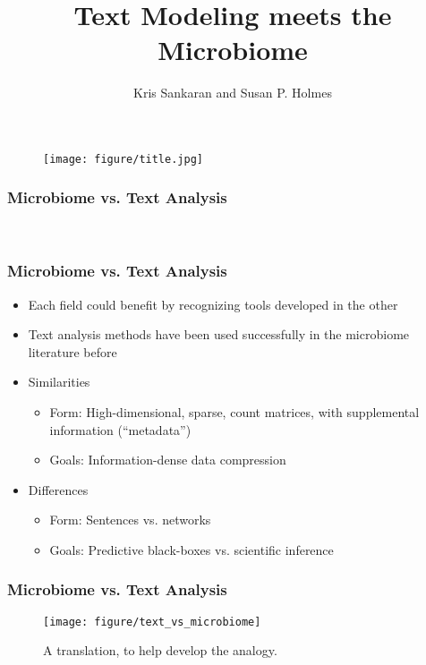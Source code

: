 \documentclass{beamer}
\title{Text Modeling meets the Microbiome}
\author{Kris Sankaran and Susan P. Holmes}
\institute{Department of Statistics, Stanford University}
\date{}
\begin{document}
\begin{frame}
  \maketitle
\begin{figure}
  \centering
  \texttt{[image: figure/title.jpg]}
\end{figure}

\end{frame}

\begin{frame}
  \frametitle{Microbiome vs. Text Analysis}
  \begingroup
  \fontsize{10pt}{10pt}\selectfont
  {\ttfamily
  \def\arraystretch{1.2}
  \setlength{\tabcolsep}{0.2em} %
  \begin{table}
     
    \\[12pt]
     
  \end{table}
  }
  \endgroup
\end{frame}

\begin{frame}
  \frametitle{Microbiome vs. Text Analysis}
 \begin{itemize}
 \item Each field could benefit by recognizing tools developed in the other
 \item Text analysis methods have been used successfully in the microbiome
   literature before \citep{cai2017learning, shafiei2015biomico,
     chen2012estimating, yan2017metatopics}
 \item Similarities
   \begin{itemize}
   \item Form: High-dimensional, sparse, count matrices, with supplemental
     information (``metadata'')
   \item Goals: Information-dense data compression
   \end{itemize}
 \item Differences
   \begin{itemize}
   \item Form: Sentences vs. networks
   \item Goals: Predictive black-boxes vs. scientific inference
   \end{itemize}
 \end{itemize} 
\end{frame}

\begin{frame}
  \frametitle{Microbiome vs. Text Analysis}
\begin{figure}[ht]
  \centering
  \texttt{[image: figure/text\_vs\_microbiome]}
  \caption{A translation, to help develop the analogy. \label{fig:label} }
\end{figure}

\end{frame}
\end{document}
